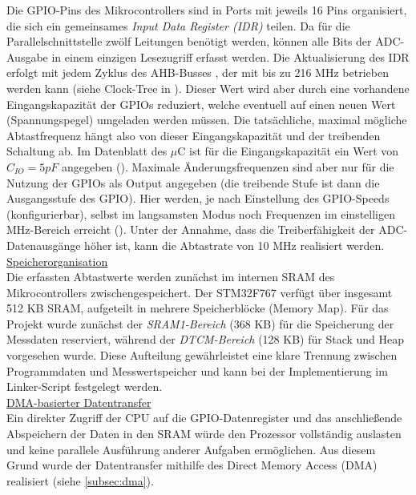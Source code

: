 \documentclass[a4paper, portrait, 12pt]{scrartcl} %
\begin{document}
Die GPIO-Pins des Mikrocontrollers sind in Ports mit jeweils 16 Pins organisiert, die sich ein gemeinsames \emph{Input Data Register (IDR)} teilen. Da für die Parallelschnittstelle zwölf Leitungen benötigt werden, können alle Bits der ADC-Ausgabe in einem einzigen Lesezugriff erfasst werden. Die Aktualisierung des IDR erfolgt mit jedem Zyklus des AHB-Busses \cite[S. 224]{STmicroelectronics2024}, der mit bis zu 216 MHz betrieben werden kann (siehe Clock-Tree in \cite[S. 154]{STmicroelectronics2024}). Dieser Wert wird aber durch eine vorhandene Eingangskapazität der GPIOs reduziert, welche eventuell auf einen neuen Wert (Spannungspegel) umgeladen werden müssen. Die tatsächliche, maximal mögliche Abtastfrequenz hängt also von dieser Eingangskapazität und der treibenden Schaltung ab. Im Datenblatt des $\mu$C ist für die Eingangskapazität ein Wert von $C_{IO}=5pF$ angegeben (\cite[S. 157]{STmicroelectronics2025}). Maximale Änderungsfrequenzen sind aber nur für die Nutzung der GPIOs als Output angegeben (die treibende Stufe ist dann die Ausgangsstufe des GPIO). Hier werden, je nach Einstellung des GPIO-Speeds (konfigurierbar), selbst im langsamsten Modus noch Frequenzen im einstelligen MHz-Bereich erreicht (\cite[S. 160f]{STmicroelectronics2025}). Unter der Annahme, dass die Treiberfähigkeit der ADC-Datenausgänge höher ist, kann die Abtastrate von 10 MHz realisiert werden.\\

\underline{Speicherorganisation}\\
Die erfassten Abtastwerte werden zunächst im internen SRAM des Mikrocontrollers zwischengespeichert. Der STM32F767 verfügt über insgesamt 512 KB SRAM, aufgeteilt in mehrere Speicherblöcke \cite[S. 77ff]{STmicroelectronics2024} (Memory Map). Für das Projekt wurde zunächst der \emph{SRAM1-Bereich} (368 KB) für die Speicherung der Messdaten reserviert, während der \emph{DTCM-Bereich} (128 KB) für Stack und Heap vorgesehen wurde. Diese Aufteilung gewährleistet eine klare Trennung zwischen Programmdaten und Messwertspeicher und kann bei der Implementierung im Linker-Script festgelegt werden.\\

\underline{DMA-basierter Datentransfer}\\
Ein direkter Zugriff der CPU auf die GPIO-Datenregister und das anschließende Abspeichern der Daten in den SRAM würde den Prozessor vollständig auslasten und keine parallele Ausführung anderer Aufgaben ermöglichen. Aus diesem Grund wurde der Datentransfer mithilfe des Direct Memory Access (DMA) realisiert (siehe \autoref{subsec:dma}).\\
\end{document}
